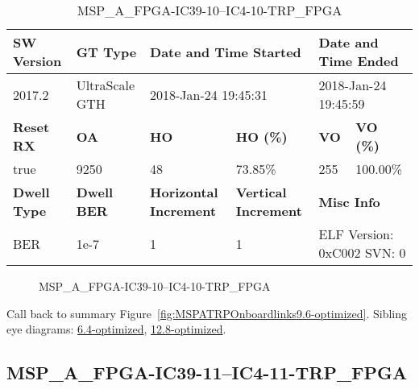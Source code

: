 \begin{table}[h]
\centering
\caption{MSP\_A\_FPGA-IC39-10--IC4-10-TRP\_FPGA}
\label{tab:MSPAFPGAIC3910IC410TRPFPGA9.6-optimized}
\begin{tabular}{@{}|l|l|l|l|l|l|@{}}
\toprule
\textbf{SW Version}                & \textbf{GT Type}   & \multicolumn{2}{l|}{\textbf{Date and Time Started}}            & \multicolumn{2}{l|}{\textbf{Date and Time Ended}}        \\ \midrule
2017.2                       & UltraScale GTH          & \multicolumn{2}{l|}{2018-Jan-24 19:45:31}                   & \multicolumn{2}{l|}{2018-Jan-24 19:45:59}               \\ \midrule
\textbf{Reset RX}                  & \textbf{OA} & \textbf{HO}   & \textbf{HO (\%)} & \textbf{VO} & \textbf{VO (\%)} \\ \midrule
true & 9250        & 48          & 73.85\%        & 255        & 100.00\%       \\ \midrule
\textbf{Dwell Type}                & \textbf{Dwell BER} & \textbf{Horizontal Increment} & \textbf{Vertical Increment}    & \multicolumn{2}{l|}{\textbf{Misc Info}}                  \\ \midrule
BER                            & 1e-7        & 1        & 1           & \multicolumn{2}{l|}{ELF Version: 0xC002 SVN: 0}                         \\ \bottomrule
\end{tabular}
\end{table}

\begin{figure}[h]
\caption{MSP\_A\_FPGA-IC39-10--IC4-10-TRP\_FPGA} \label{fig:MSPAFPGAIC3910IC410TRPFPGA9.6-optimized}
\end{figure}

Call back to summary Figure~\ref{fig:MSPATRPOnboardlinks9.6-optimized}.
Sibling eye diagrams: \hyperref[sec:MSPAFPGAIC3910IC410TRPFPGA6.4-optimized]{6.4-optimized}, \hyperref[sec:MSPAFPGAIC3910IC410TRPFPGA12.8-optimized]{12.8-optimized}.

\clearpage
\newpage


\subsection{MSP\_A\_FPGA-IC39-11--IC4-11-TRP\_FPGA}\label{sec:MSPAFPGAIC3911IC411TRPFPGA9.6-optimized}

